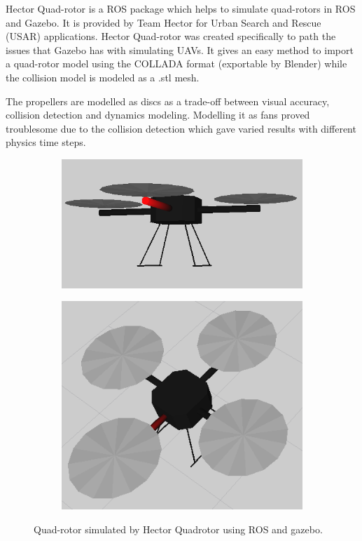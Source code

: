\documentclass[hidelinks,BTech]{iitmdiss}
\begin{document}
Hector Quad-rotor \cite{HectorQuadrotor} is a ROS package which helps to simulate quad-rotors in ROS and Gazebo. It is provided by Team Hector for Urban Search and Rescue (USAR) applications. Hector Quad-rotor was created specifically to path the issues that Gazebo has with simulating UAVs. It gives an easy method to import a quad-rotor model using the COLLADA format (exportable by Blender) while the collision model is modeled as a .stl mesh.

The propellers are modelled as discs as a trade-off between visual accuracy, collision detection and dynamics modeling. Modelling it as fans proved troublesome due to the collision detection which gave varied results with different physics time steps.

\begin{figure}[H]
  \centering
    \begin{subfigure}[c]{0.45\textwidth}
      \centering
        \includegraphics[width=\textwidth]{quadrotor_sim.png}
    \end{subfigure}
    \begin{subfigure}[c]{0.45\textwidth}
      \centering
        \includegraphics[width=\textwidth]{quadrotor_sim2.png}
    \end{subfigure}
    \caption{Quad-rotor simulated by Hector Quadrotor using ROS and gazebo.}
\end{figure}
\end{document}
